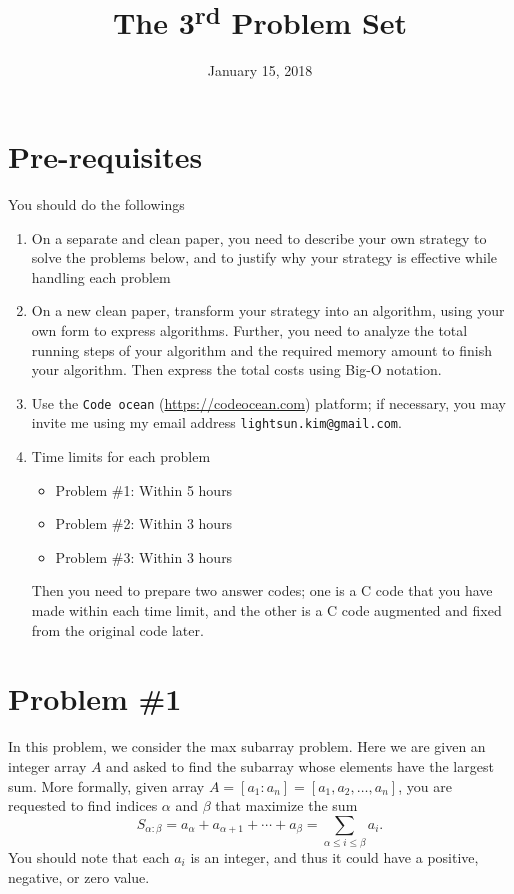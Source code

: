 \documentclass{article}
\date{January 15, 2018}
\title{The 3\textsuperscript{rd} Problem Set}
\begin{document}
\maketitle
\section*{Pre-requisites}
You should do the followings
\begin{enumerate}
\item On a separate and clean paper,  you need to describe your own strategy to solve the problems below, and 
	to justify why your strategy is effective while handling each problem
\item On a new clean paper, transform your strategy into an algorithm, using your own form to express algorithms.
	Further, you need to analyze the total running steps of your algorithm and the required memory amount to finish your algorithm.
	Then express the total costs using Big-O notation.
\item Use the \texttt{Code ocean} (\url{https://codeocean.com}) platform; if necessary, you may invite me using my email address 
\texttt{lightsun.kim@gmail.com}.
\item Time limits for each problem
\begin{itemize}
\item Problem \#1: Within 5 hours
\item Problem \#2: Within 3 hours
\item Problem \#3: Within 3 hours
\end{itemize}
Then you need to prepare two answer codes; one is a C code that you have made within each time limit, and the
other is a C code augmented and fixed from the original code later.
\end{enumerate}

\newpage

\section{Problem \#1}

In this problem, we consider the max subarray problem. 
Here we are given an integer  array $A$ and asked to find the subarray
whose elements have the largest sum. More formally,
given array $A=[a_1:a_n]=[a_1,a_2,\ldots,a_n]$, you are requested to find indices 
$\alpha$ and $\beta$ that maximize the sum
\begin{equation*}
S_{\alpha:\beta}=a_{\alpha}+a_{\alpha+1}+\cdots+a_{\beta}=\sum_{\alpha\leq i\leq \beta} a_i.
\end{equation*}
You should note that each $a_i$ is an integer, and thus it could have a positive, negative, or zero value.
\end{document}
